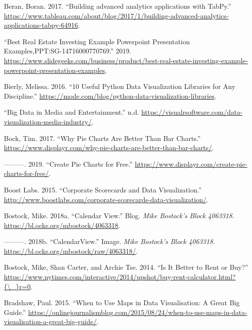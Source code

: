 \documentclass[]{book}
\begin{document}
\leavevmode\hypertarget{ref-TabPy}{}%
Beran, Boran. 2017. ``Building advanced analytics applications with TabPy.'' \url{https://www.tableau.com/about/blog/2017/1/building-advanced-analytics-applications-tabpy-64916}.

\leavevmode\hypertarget{ref-slide_geeks}{}%
``Best Real Estate Investing Example Powerpoint Presentation Examples,PPT:SG-14716000770769.'' 2019. \url{https://www.slidegeeks.com/business/product/best-real-estate-investing-example-powerpoint-presentation-examples}.

\leavevmode\hypertarget{ref-PythonDataVizLibraries}{}%
Bierly, Melissa. 2016. ``10 Useful Python Data Visualization Libraries for Any Discipline.'' \url{https://mode.com/blog/python-data-visualization-libraries}.

\leavevmode\hypertarget{ref-media_entertainment}{}%
``Big Data in Media and Entertainment.'' n.d. \url{https://visualrsoftware.com/data-visualization-media-industry/}.

\leavevmode\hypertarget{ref-Pro-Pie-charts}{}%
Bock, Tim. 2017. ``Why Pie Charts Are Better Than Bar Charts.'' \url{https://www.displayr.com/why-pie-charts-are-better-than-bar-charts/}.

\leavevmode\hypertarget{ref-displayr-create-pie-charts}{}%
---------. 2019. ``Create Pie Charts for Free.'' \url{https://www.displayr.com/create-pie-charts-for-free/}.

\leavevmode\hypertarget{ref-SCORECARDS}{}%
Boost Labs. 2015. ``Corporate Scorecards and Data Visualization.'' \url{http://www.boostlabs.com/corporate-scorecards-data-visualization/}.

\leavevmode\hypertarget{ref-Calendar_Layout}{}%
Bostock, Mike. 2018a. ``Calendar View.'' Blog. \emph{Mike Bostock's Block 4063318}. \url{https://bl.ocks.org/mbostock/4063318}.

\leavevmode\hypertarget{ref-CalendarView}{}%
---------. 2018b. ``CalendarView.'' Image. \emph{Mike Bostock's Block 4063318}. \url{https://bl.ocks.org/mbostock/raw/4063318/}.

\leavevmode\hypertarget{ref-rent_or_buy}{}%
Bostock, Mike, Shan Carter, and Archie Tse. 2014. ``Is It Better to Rent or Buy?'' \href{https://www.nytimes.com/interactive/2014/upshot/buy-rent-calculator.html?\%7B/_\%7Dr=0}{https://www.nytimes.com/interactive/2014/upshot/buy-rent-calculator.html?\{\textbackslash{}\_\}r=0}.

\leavevmode\hypertarget{ref-Bradshaw}{}%
Bradshaw, Paul. 2015. ``When to Use Maps in Data Visualisation: A Great Big Guide.'' \url{https://onlinejournalismblog.com/2015/08/24/when-to-use-maps-in-data-visualisation-a-great-big-guide/}.
\end{document}
